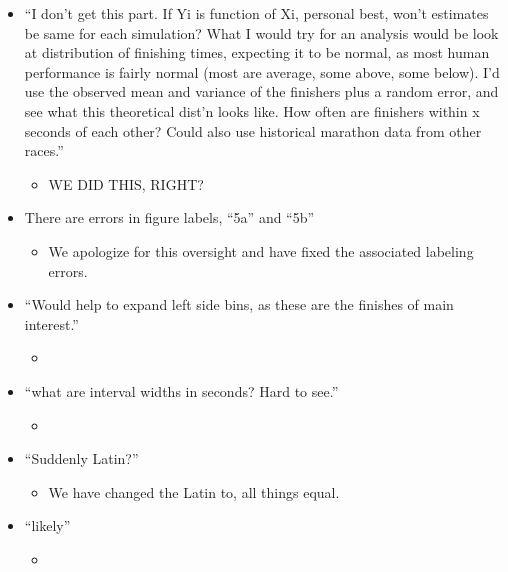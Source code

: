 \documentclass[12pt]{article}
\begin{document}
\begin{itemize}
\item ``I don't get this part. If Yi is function of Xi, personal best,
  won't estimates be same for each simulation?  What I would try for
  an analysis would be look at distribution of finishing times,
  expecting it to be normal, as most human performance is fairly
  normal (most are average, some above, some below). I'd use the
  observed mean and variance of the finishers plus a random error, and
  see what this theoretical dist'n looks like. How often are finishers
  within x seconds of each other? Could also use historical marathon
  data from other races.''
   \begin{itemize}
  \item WE DID THIS, RIGHT?
  \end{itemize}
  
\item There are errors in figure labels, ``5a'' and ``5b''
   \begin{itemize}
  \item  We apologize for this oversight and have fixed the associated
  labeling errors.
  \end{itemize}


\item ``Would help to expand left side bins, as these are the finishes
  of main interest.''
   \begin{itemize}
  \item
  \end{itemize}


\item ``what are interval widths in seconds? Hard to see.''
   \begin{itemize}
  \item
  \end{itemize}


\item ``Suddenly Latin?''
   \begin{itemize}
   \item We have changed the Latin to, all things equal. 
   \end{itemize}

\item ``likely''
   \begin{itemize}
  \item
  \end{itemize}


\end{itemize}

 
\end{document}
